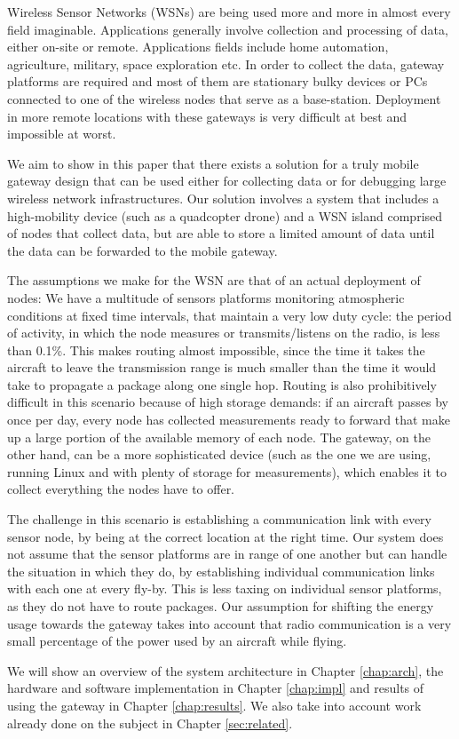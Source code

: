 Wireless Sensor Networks (WSNs) are being used more and more in almost every
field imaginable. Applications generally involve collection and processing of
data, either on-site or remote. Applications fields include home automation,
agriculture, military, space exploration etc.\cite{baggio2005wireless} In
order to collect the data, gateway platforms \cite{steenkamp2009wireless} are
required and most of them are stationary bulky devices or PCs connected to one
of the wireless nodes that serve as a base-station. Deployment in more remote
locations with these gateways is very difficult at best and impossible at
worst. 

We aim to show in this paper that there exists a solution for a truly mobile
gateway design that can be used either for collecting data or for debugging
large wireless network infrastructures. Our solution involves a system that
includes a high-mobility device (such as a quadcopter drone) and a WSN island
comprised of nodes that collect data, but are able to store a limited amount
of data until the data can be forwarded to the mobile
gateway.\cite{valente2011air}

The assumptions we make for the WSN are that of an actual deployment of nodes:
We have a multitude of sensors platforms monitoring atmospheric conditions at
fixed time intervals, that maintain a very low duty cycle: the period of
activity, in which the node measures or transmits/listens on the radio, is
less than 0.1\%. This makes routing almost impossible, since the time it takes
the aircraft to leave the transmission range is much smaller than the time it
would take to propagate a package along one single hop. Routing is also
prohibitively difficult in this scenario because of high storage demands: if
an aircraft passes by once per day, every node has collected measurements
ready to forward that make up a large portion of the available memory of each
node. The gateway, on the other hand, can be a more sophisticated device (such
as the one we are using, running Linux and with plenty of storage for
measurements), which enables it to collect everything the nodes have to offer. 

The challenge in this scenario is establishing a communication link with every
sensor node, by being at the correct location at the right time. Our system
does not assume that the sensor platforms are in range of one another but can
handle the situation in which they do, by establishing individual communication
links with each one at every fly-by. This is less taxing on individual sensor
platforms, as they do not have to route packages. Our assumption for shifting
the energy usage towards the gateway takes into account that radio
communication is a very small percentage of the power used by an aircraft
while flying.

We will show an overview of the system architecture in Chapter
\ref{chap:arch}, the hardware and software implementation in Chapter
\ref{chap:impl} and results of using the gateway in Chapter
\ref{chap:results}. We also take into account work already done on the subject
in Chapter \ref{sec:related}.

